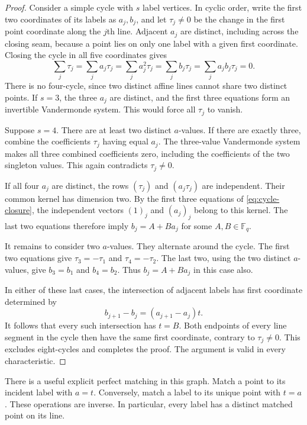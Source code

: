 \documentclass[11pt]{amsart}
\theoremstyle{definition}
\theoremstyle{remark}
\numberwithin{equation}{section}
\newcommand{\F}{\mathbb F}
\begin{document}
\begin{proof}
Consider a simple cycle with $s$ label vertices. In cyclic order,
write the first two coordinates of its labels as $a_j,b_j$, and let
$\tau_j\ne0$ be the change in the first point coordinate along
the $j$th line. Adjacent $a_j$ are distinct, including across the
closing seam, because a point lies on only one label with a given
first coordinate. Closing the cycle in all five coordinates gives
\begin{equation}\label{eq:cycle-closure}
 \sum_j\tau_j=\sum_j a_j\tau_j=\sum_j a_j^2\tau_j
 =\sum_j b_j\tau_j=\sum_j a_jb_j\tau_j=0.
\end{equation}
There is no four-cycle, since two distinct affine lines cannot share
two distinct points. If $s=3$, the three $a_j$ are distinct, and
the first three equations form an invertible Vandermonde system.
This would force all $\tau_j$ to vanish.

Suppose $s=4$. There are at least two distinct $a$-values. If there
are exactly three, combine the coefficients $\tau_j$ having equal
$a_j$. The three-value Vandermonde system makes all three combined
coefficients zero, including the coefficients of the two singleton
values. This again contradicts $\tau_j\ne0$.

If all four $a_j$ are distinct, the rows $(\tau_j)$ and
$(a_j\tau_j)$ are independent. Their common kernel has dimension
two. By the first three equations of \eqref{eq:cycle-closure},
the independent vectors $(1)_j$ and $(a_j)_j$ belong to this kernel.
The last two equations therefore imply
$b_j=A+B a_j$ for some $A,B\in\F_q$.

It remains to consider two $a$-values. They alternate around the
cycle. The first two equations give $\tau_3=-\tau_1$ and
$\tau_4=-\tau_2$. The last two, using the two distinct $a$-values,
give $b_3=b_1$ and $b_4=b_2$. Thus $b_j=A+B a_j$ in this case also.

In either of these last cases, the intersection of adjacent labels
has first coordinate determined by
\[
 b_{j+1}-b_j=(a_{j+1}-a_j)t.
\]
It follows that every such intersection has $t=B$. Both endpoints
of every line segment in the cycle then have the same first
coordinate, contrary to $\tau_j\ne0$. This excludes eight-cycles
and completes the proof. The argument is valid in every
characteristic.
\end{proof}

There is a useful explicit perfect matching in this graph. Match a
point to its incident label with $a=t$. Conversely, match a label
to its unique point with $t=a$. These operations are inverse. In
particular, every label has a distinct matched point on its line.
\end{document}
